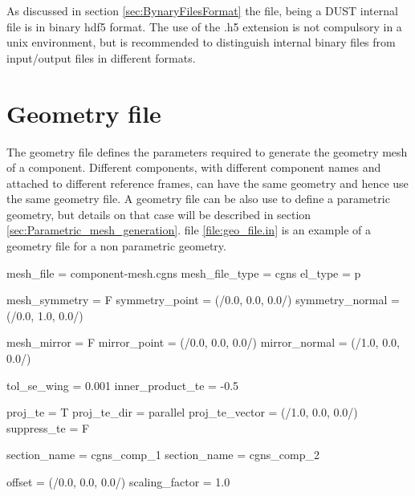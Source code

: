 As discussed in section \ref{sec:BynaryFilesFormat} the file, being a DUST internal file is in binary hdf5 format. The use of the .h5 extension is not compulsory in a unix environment, but is recommended to distinguish internal binary files from input/output files in different formats.

\section{Geometry file}
The geometry file defines the parameters required to generate the geometry mesh of a component. Different components, with different component names and attached to different reference frames, can have the same geometry and hence use the same geometry file. A geometry file can be also use to define a parametric geometry, but details on that case will be described in section \ref{sec:Parametric_mesh_generation}. file \ref{file:geo_file.in} is an example of a geometry file for a non parametric geometry.

\begin{inputfile}[frame=single, caption={geo\_file.in}, label={file:geo_file.in}]
mesh_file = component-mesh.cgns
mesh_file_type = cgns
el_type = p

mesh_symmetry = F
symmetry_point  = (/0.0, 0.0, 0.0/)
symmetry_normal = (/0.0, 1.0, 0.0/)

mesh_mirror = F
mirror_point  = (/0.0, 0.0, 0.0/)
mirror_normal = (/1.0, 0.0, 0.0/)

tol_se_wing  = 0.001
inner_product_te = -0.5

proj_te = T
proj_te_dir = parallel
proj_te_vector = (/1.0, 0.0, 0.0/)
suppress_te = F

section_name = cgns_comp_1
section_name = cgns_comp_2

offset = (/0.0, 0.0, 0.0/)
scaling_factor = 1.0
\end{inputfile}

